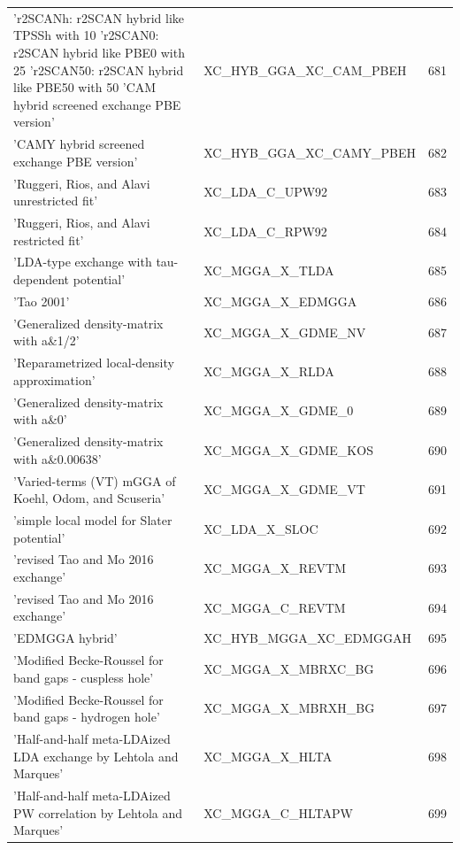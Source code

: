 \documentclass[final,12pt]{article}
\begin{document}
{{{{{{\begin{table}[!h]
\begin{center}
\begin{tabular}{llr}
  'r2SCANh: r2SCAN hybrid like TPSSh with 10%
  'r2SCAN0: r2SCAN hybrid like PBE0 with 25%
  'r2SCAN50: r2SCAN hybrid like PBE50 with 50%
  'CAM hybrid screened exchange PBE version' & XC\_HYB\_GGA\_XC\_CAM\_PBEH  &681\\
  'CAMY hybrid screened exchange PBE version' & XC\_HYB\_GGA\_XC\_CAMY\_PBEH  &682\\
  'Ruggeri, Rios, and Alavi unrestricted fit' & XC\_LDA\_C\_UPW92  &683\\
  'Ruggeri, Rios, and Alavi restricted fit' & XC\_LDA\_C\_RPW92  &684\\
  'LDA-type exchange with tau-dependent potential' & XC\_MGGA\_X\_TLDA  &685\\
  'Tao 2001' & XC\_MGGA\_X\_EDMGGA  &686\\
  'Generalized density-matrix with a\&1/2' & XC\_MGGA\_X\_GDME\_NV  &687\\
  'Reparametrized local-density approximation' & XC\_MGGA\_X\_RLDA  &688\\
  'Generalized density-matrix with a\&0' & XC\_MGGA\_X\_GDME\_0  &689\\
  'Generalized density-matrix with a\&0.00638' & XC\_MGGA\_X\_GDME\_KOS  &690\\
  'Varied-terms (VT) mGGA of Koehl, Odom, and Scuseria' & XC\_MGGA\_X\_GDME\_VT  &691\\
  'simple local model for Slater potential' & XC\_LDA\_X\_SLOC  &692\\
  'revised Tao and Mo 2016 exchange' & XC\_MGGA\_X\_REVTM  &693\\
  'revised Tao and Mo 2016 exchange' & XC\_MGGA\_C\_REVTM  &694\\
  'EDMGGA hybrid' & XC\_HYB\_MGGA\_XC\_EDMGGAH  &695\\
  'Modified Becke-Roussel for band gaps - cuspless hole' & XC\_MGGA\_X\_MBRXC\_BG  &696\\
  'Modified Becke-Roussel for band gaps - hydrogen hole' & XC\_MGGA\_X\_MBRXH\_BG  &697\\
  'Half-and-half meta-LDAized LDA exchange by Lehtola and Marques' & XC\_MGGA\_X\_HLTA  &698\\
  'Half-and-half meta-LDAized PW correlation by Lehtola and Marques' & XC\_MGGA\_C\_HLTAPW  &699\\

\end{tabular}
\end{center}
\end{table}}}}}}}
\end{document}
